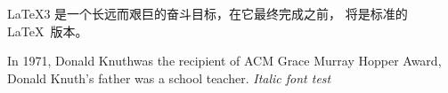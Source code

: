 \documentclass{ctexart}
\newcommand{\mycmdA}{Donald Knuth}
\begin{document}
\LaTeX3 是一个长远而艰巨的奋斗目标，在它最终完成之前，\LaTeXe{} 将是标准的 \LaTeX\ 版本。
\par
In 1971, \mycmdA was the recipient of ACM Grace Murray Hopper Award, \mycmdA 's father was a school teacher.
\textit{Italic font test}
\end{document}

